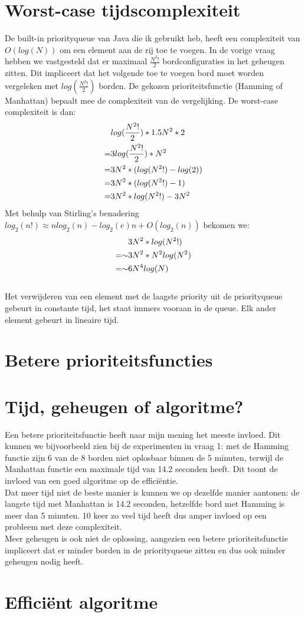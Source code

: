 \documentclass[11pt, a4paper]{article}
\begin{document}
\section*{Worst-case tijdscomplexiteit}
De built-in priorityqueue van Java die ik gebruikt heb, heeft een complexiteit van $O(log(N))$ om een element aan de rij toe te voegen. In de vorige vraag hebben we vastgesteld dat er maximaal $\frac{N^2!}{2}$ bordconfiguraties in het geheugen zitten. Dit impliceert dat het volgende toe te voegen bord moet worden vergeleken met $log(\frac{N^2!}{2})$ borden. De gekozen prioriteitsfunctie (Hamming of Manhattan) bepaalt mee de complexiteit van de vergelijking. De worst-case complexiteit is dan:
\\
	\begin{align}
	\centering
		&log(\frac{N^2!}{2}) * 1.5N^2 * 2 \\
	=   & 3log(\frac{N^2!}{2})*N^{2} \\
	=	& 3N^2*(log(N^2!)-log(2)) \\
	=   & 3N^2*(log(N^2!)-1) \\
	=   & 3N^2*log(N^2!) - 3N^2
	\end{align}
	Met behulp van Stirling's benadering $log_2(n!) \approx nlog_2(n) - log_2(e)n + O(log_2(n))$ bekomen we:
	\begin{align}
	\centering
		& 3N^2*log(N^2!) \\
	=\sim	& 3N^2*N^2log(N^2)\\
	=\sim	& 6N^4log(N)
	\end{align}
	\\
Het verwijderen van een element met de laagste priority uit de priorityqueue gebeurt in constante tijd, het staat immers vooraan in de queue. Elk ander element gebeurt in lineaire tijd. 
\section*{Betere prioriteitsfuncties}

	
\newpage
\section*{Tijd, geheugen of algoritme?}
Een betere prioriteitsfunctie heeft naar mijn mening het meeste invloed. Dit kunnen we bijvoorbeeld zien bij de experimenten in vraag 1: met de Hamming functie zijn 6 van de 8 borden niet oplosbaar binnen de 5 minuten, terwijl de Manhattan functie een maximale tijd van 14.2 seconden heeft. Dit toont de invloed van een goed algoritme op de effici\"entie.\\
Dat meer tijd niet de beste manier is kunnen we op dezelfde manier aantonen: de langste tijd met Manhattan is 14.2 seconden, hetzelfde bord met Hamming is meer dan 5 minuten. 10 keer zo veel tijd heeft dus amper invloed op een probleem met deze complexiteit.\\
Meer geheugen is ook niet de oplossing, aangezien een betere prioriteitsfunctie impliceert dat er minder borden in de priorityqueue zitten en dus ook minder geheugen nodig heeft.
	
\section*{Effici\"ent algoritme}
	
\end{document}
